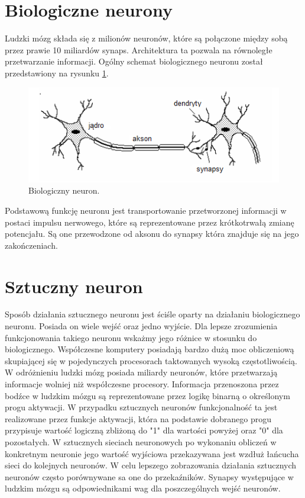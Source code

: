 \section{Biologiczne neurony}

Ludzki mózg składa się z milionów neuronów, które są połączone między sobą przez prawie 10 miliardów synaps. Architektura ta pozwala na równoległe przetwarzanie informacji. Ogólny schemat biologicznego neuronu został przedstawiony na rysunku \ref{fig:bio_neuron}.

\begin{figure}[!htbp]
\centering
\includegraphics[width=1\linewidth]{./include/bio_neuron}
\caption{Biologiczny neuron.}
\label{fig:bio_neuron}
\end{figure}

Podstawową funkcję neuronu jest transportowanie przetworzonej informacji w postaci impulsu nerwowego, które są reprezentowane przez krótkotrwałą zmianę potencjału. Są one przewodzone od aksonu do synapsy która znajduje się na jego zakończeniach. 

\section{Sztuczny neuron}
Sposób działania sztucznego neuronu jest ściśle oparty na działaniu biologicznego neuronu. Posiada on wiele wejść oraz jedno wyjście. Dla lepsze zrozumienia funkcjonowania takiego neuronu wskażmy jego różnice w stosunku do biologicznego. %
Współczesne komputery posiadają bardzo dużą moc obliczeniową skupiającej się w pojedynczych procesorach taktowanych wysoką częstotliwością. W odróżnieniu ludzki mózg posiada miliardy neuronów, które przetwarzają informacje wolniej niż współczesne procesory. Informacja przenoszona przez bodźce w ludzkim mózgu są reprezentowane przez logikę binarną o określonym progu aktywacji. W przypadku sztucznych neuronów funkcjonalność ta jest realizowane przez funkcje aktywacji, która na podstawie dobranego progu przypisuje wartość logiczną zbliżoną do "1" dla wartości powyżej oraz "0" dla pozostałych. W sztucznych sieciach neuronowych po wykonaniu obliczeń w konkretnym neuronie jego wartość wyjściowa przekazywana jest wzdłuż łańcucha sieci do kolejnych neuronów. 
W celu lepszego zobrazowania działania sztucznych neuronów często porównywane sa one do przekaźników. Synapsy występujące w ludzkim mózgu są odpowiednikami wag dla poszczególnych wejść neuronów.

